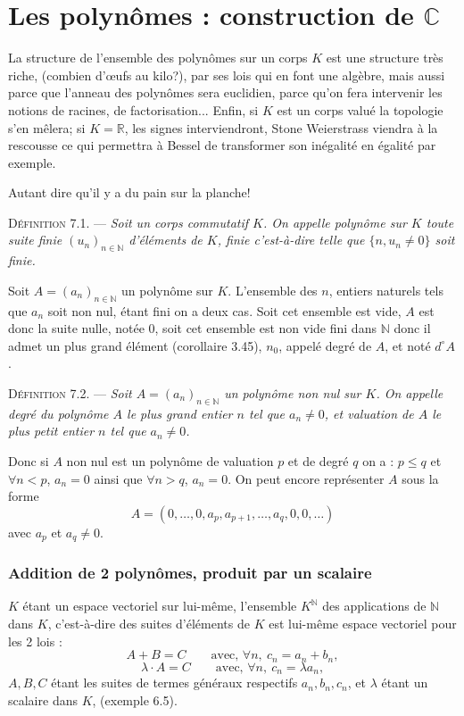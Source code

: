 \chapter{Les polynômes : construction de $\mathbb C$}

La structure de l'ensemble des polynômes sur un corps $K$ est une structure très riche, (combien d'œufs au kilo?), par ses lois qui en font une algèbre, mais aussi parce que l'anneau des polynômes sera euclidien, parce qu'on fera intervenir les notions de racines, de factorisation... Enfin, si $K$ est un corps valué la topologie s'en mêlera; si $K=\mathbb R$, les signes interviendront, Stone Weierstrass viendra à la rescousse ce qui permettra à Bessel de transformer son inégalité en égalité par exemple.

Autant dire qu'il y a du pain sur la planche!


\medskip\noindent\textsc{Définition 7.1.} --- \emph{Soit un corps commutatif $K$. On appelle polynôme sur $K$ toute suite finie $(u_n)_{n\in\mathbb N}$ d'éléments de $K$, finie c'est-à-dire telle que $\{n,u_n\ne0\}$ soit finie.}

Soit $A=(a_n)_{n\in\mathbb N}$ un polynôme sur $K$. L'ensemble des $n$, entiers naturels tels que $a_n$ soit non nul, étant fini on a deux cas. Soit cet ensemble est vide, $A$ est donc la suite nulle, notée 0, soit cet ensemble est non vide fini dans $\mathbb N$ donc il admet un plus grand élément (corollaire 3.45), $n_0$, appelé degré de $A$, et noté $d^\circ A$.

\medskip\noindent\textsc{Définition 7.2.} --- \emph{Soit $A=(a_n)_{n\in\mathbb N}$ un polynôme non nul sur $K$. On appelle degré du polynôme $A$ le plus grand entier $n$ tel que $a_n\ne0$, et valuation de $A$ le plus petit entier $n$ tel que $a_n\ne0$.}

Donc si $A$ non nul est un polynôme de valuation $p$ et de degré $q$ on a : $p\le q$ et $\forall n<p$, $a_n=0$ ainsi que $\forall n>q$, $a_n=0$. On peut encore représenter $A$ sous la forme
\[
A=(0,\ldots,0,a_p,a_{p+1},\ldots,a_q,0,0,\ldots)
\]
avec $a_p$ et $a_q\ne0$.

\subsection*{Addition de 2 polynômes, produit par un scalaire}

$K$ étant un espace vectoriel sur lui-même, l'ensemble $K^{\mathbb N}$ des applications de $\mathbb N$ dans $K$, c'est-à-dire des suites d'éléments de $K$ est lui-même espace vectoriel pour les 2 lois :
\[
A+B=C\qquad\text{avec, }\forall n,\ c_n=a_n+b_n,
\]
\[
\lambda\cdot A=C\qquad\text{avec, }\forall n,\ c_n=\lambda a_n,
\]
$A,B,C$ étant les suites de termes généraux respectifs $a_n,b_n,c_n$, et $\lambda$ étant un scalaire dans $K$, (exemple 6.5).

